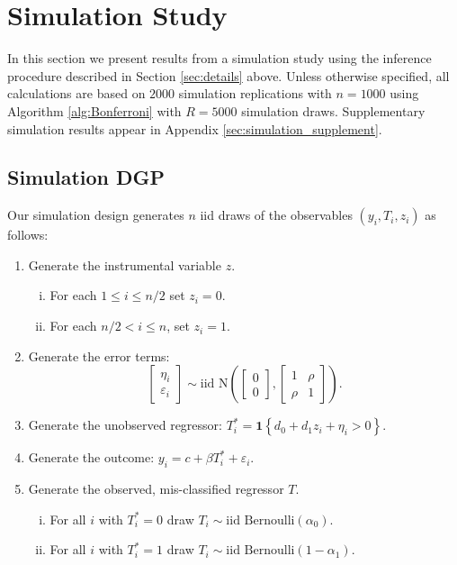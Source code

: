 \section{Simulation Study}

In this section we present results from a simulation study using the inference procedure described in Section \ref{sec:details} above.
Unless otherwise specified, all calculations are based on $2000$ simulation replications with $n = 1000$ using Algorithm \ref{alg:Bonferroni} with $R = 5000$ simulation draws.
Supplementary simulation results appear in Appendix \ref{sec:simulation_supplement}.

\subsection{Simulation DGP}
\label{sec:DGP}
Our simulation design generates $n$ iid draws of the observables $(y_i, T_i, z_i)$ as follows:
\begin{enumerate}
  \item Generate the instrumental variable $z$.
    \begin{enumerate}[(i)]
      \item For each $1 \leq i \leq n/2$ set $z_i = 0$.
      \item For each $n/2 < i \leq n$, set $z_i = 1$.
    \end{enumerate}
  \item Generate the error terms: 
    \[
      \left[
      \begin{array}{c}
        \eta_i \\ \varepsilon_i
      \end{array}
    \right] \sim \mbox{iid N}\left( \left[
\begin{array}{c}
  0 \\ 0
\end{array}
\right], \left[
\begin{array}{cc}
  1 & \rho \\
  \rho & 1
\end{array}
\right]\right).
\]
  \item Generate the unobserved regressor: $T^*_i = \mathbf{1}\left\{ d_0 + d_1 z_i + \eta_i > 0 \right\}$.
  \item Generate the outcome: $y_i = c + \beta T_i^* + \varepsilon_i$.  
  \item Generate the observed, mis-classified regressor $T$.
    \begin{enumerate}[(i)]
      \item For all $i$ with $T^*_i = 0$ draw $T_i \sim \mbox{iid Bernoulli}(\alpha_0)$. 
      \item For all $i$ with $T^*_i = 1$ draw $T_i \sim \mbox{iid Bernoulli}(1 - \alpha_1)$.
    \end{enumerate}
\end{enumerate}
